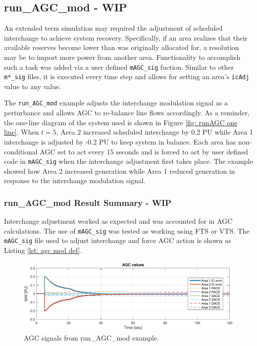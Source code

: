 \pagebreak
\subsection{run\_AGC\_mod - WIP} \label{ex: agc mod}
An extended term simulation may required the adjustment of scheduled interchange to achieve system recovery.
Specifically, if an area realizes that their available reserves become lower than was originally allocated for, a resolution may be to import more power from another area.
Functionality to accomplish such a task was added via a user defined \verb|mAGC_sig| fuction.
Similar to other \verb|m*_sig| files, it is executed every time step and allows for setting an area's \verb|icAdj| value to any value.


The \verb|run_AGC_mod| example adjusts the interchange modulation signal as a perturbance and allows AGC to re-balance line flows accordingly.
As a reminder, the one-line diagram of the system used is shown in Figure \ref{fig: runAGC one line}.
When $t=5$, Area 2 increased scheduled interchange by 0.2 PU while Area 1 interchange is adjusted by -0.2 PU to keep system in balance.
Each area has non-conditional AGC set to act every 15 seconds and is forced to act by user defined code in \verb|mAGC_sig| when the interchange adjustment first takes place.
The example showed how Area 2 increased generation while Area 1 reduced generation in response to the interchange modulation signal.


\subsubsection{run\_AGC\_mod Result Summary - WIP}
Interchange adjustment worked as expected and was accounted for in AGC calculations.
The use of \verb|mAGC_sig| was tested as working using FTS or VTS.
The \verb|mAGC_sig| file used to adjust interchange and force AGC action is shown as Listing \ref{lst: agc mod def}.


\begin{figure}[H]
	\centering
	\footnotesize
	\includegraphics[width=\linewidth]{examples/agcMod/agcModSig01}
	\caption{AGC signals from run\_AGC\_mod example.}
	\label{fig: AGCmod liveplot}
\end{figure}%

